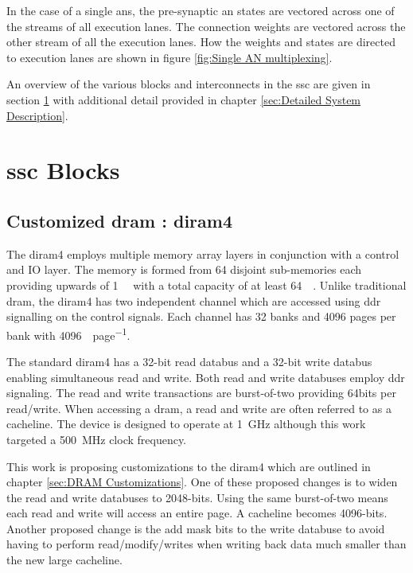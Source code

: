 In the case of a single \acp{an}, the pre-synaptic \ac{an} states are vectored across one of the streams of all execution lanes.
The connection weights are vectored across the other stream of all the execution lanes.
How the weights and states are directed to execution lanes are shown in figure \ref{fig:Single AN multiplexing}.

An overview of the various blocks and interconnects in the \ac{ssc} are given in section \ref{sec:SSC Blocks} with additional detail provided in chapter \ref{sec:Detailed System Description}.

\section{\acf{ssc} Blocks}
\label{sec:SSC Blocks}

\subsection{Customized \ac{dram} : \acf{diram4}}
\label{sec:3ddram}
The \ac{diram4} \cite{tezzaron:diram4} employs multiple memory array layers in conjunction with a control and IO layer.
The memory is formed from 64 disjoint sub-memories each providing upwards of \SI[per-mode=symbol]{1}{\giga\bit} with a total capacity of at least \SI[per-mode=symbol]{64}{\giga\bit}.
Unlike traditional \ac{dram}, the \ac{diram4} has two independent channel which are accessed using \ac{ddr} signalling on the control signals.
Each channel has 32 banks and 4096 pages per bank with \SI[per-mode=symbol]{4096}{\bit\per page}.

The standard \ac{diram4} has a 32-bit read databus and a 32-bit write databus enabling simultaneous read and write. Both read and write databuses employ \ac{ddr} signaling.
The read and write transactions are burst-of-two providing 64bits per read/write. When accessing a \ac{dram}, a read and write are often referred to as a cacheline.
The device is designed to operate at \SI[per-mode=symbol]{1}{\giga\hertz} although this work targeted a \SI[per-mode=symbol]{500}{\mega\hertz} clock frequency.

This work is proposing customizations to the \ac{diram4} which are outlined in chapter \ref{sec:DRAM Customizations}. One of these proposed changes is to widen the read and write databuses to 2048-bits.
Using the same burst-of-two means each read and write will access an entire page. A cacheline becomes 4096-bits.
Another proposed change is the add mask bits to the write databuse to avoid having to perform read/modify/writes when writing back data much smaller than the new large cacheline.

